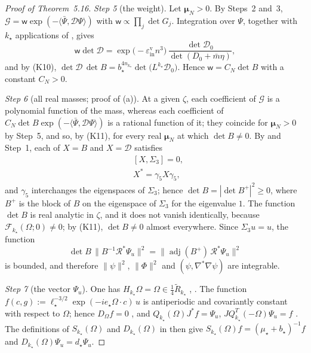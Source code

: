 \documentclass[11pt,letterpaper,reqno]{amsart}
\theoremstyle{definition}
\begin{document}
\begin{proof}[Proof of Theorem~5.16]
\emph{Step 5} (the weight).
Let $\boldsymbol\mu_N>0$.
By Steps~2 and~3, $\mathcal G=\mathsf w\exp(-\langle\bar\Psi,\mathcal D\Psi\rangle)$ with $\mathsf w\propto\prod_j\det G_j$.
Integration over $\Psi$, together with $k_\star$ applications of \cite[Proposition~22.2\,(a)]{QEDIII}, gives
\begin{equation*}
\mathsf w\det\mathcal D=\exp\bigl(-\varepsilon^{\mathrm v}_{\mathrm{in}}n^3\bigr)\,\frac{\det\mathcal D_0}{\det(D_0+\bar m\eta)},
\end{equation*}
and by (K10), $\det\mathcal D\,\allowbreak \det B=\allowbreak b_\star^{4n_{k_\star}}\det\bigl(L^{k_\star}\mathcal D_0\bigr)$.
Hence $\mathsf w=C_N\det B$ with a constant $C_N>0$.

\emph{Step 6} (all real masses; proof of (a)).
At a given $\zeta$, each coefficient of $\mathcal G$ is a polynomial function of the mass, whereas each coefficient of $C_N\det B\exp(-\langle\bar\Psi,\mathcal D\Psi\rangle)$ is a rational function of it;
they coincide for $\boldsymbol\mu_N>0$ by Step~5, and so, by (K11), for every real $\boldsymbol\mu_N$ at which $\det B\ne0$.
By \cite[(I.O2), (I.O3)]{QEDIII} and Step~1, each of $X=B$ and $X=\mathcal D$ satisfies
\begin{align}
&[X,\Sigma_3]=0,\tag{P1}\\
&X^*=\gamma_5X\gamma_5,\tag{P2}
\end{align}
and $\gamma_5$ interchanges the eigenspaces of $\Sigma_3$;
hence $\det B=|\det B^+|^2\ge0$, where $B^+$ is the block of $B$ on the eigenspace of $\Sigma_3$ for the eigenvalue $1$.
The function $\det B$ is real analytic in $\zeta$, and it does not vanish identically, because $\mathscr F_{k_\star}(\Omega;0)\ne0$;
by (K11), $\det B\ne0$ almost everywhere.
Since $\Sigma_3u=u$, the function
\begin{equation*}
\det B\,\|B^{-1}\mathcal R^*\Psi_u\|^2=\|\operatorname{adj}(B^+)\,\mathcal R^*\Psi_u\|^2
\end{equation*}
is bounded, and therefore $\|\psi\|^2$, $\|\Phi\|^2$ and $(\psi,\nabla^*\nabla\psi)$ are integrable.

\emph{Step 7} (the vector $\Psi_u$).
One has $H_{k_\star}\Omega=\Omega\in\frac14\tilde R_{k_\star}$ \cite[Proposition~5.31]{QEDI}, \cite{QEDIII}.
The function $f(c,g):=\ell_\star^{-3/2}\exp(-ie_\star\Omega\cdot c)\,u$ is antiperiodic and covariantly constant with respect to $\Omega$;
hence $D_\Omega f=0$ \cite[(I.O8)]{QEDIII}, and $Q_{k_\star}(\Omega)J^*f=\Psi_u$, $JQ^T_{k_\star}(-\Omega)\Psi_u=f$ \cite{QEDIII}.
The definitions of $S_{k_\star}(\Omega)$ and $D_{k_\star}(\Omega)$ in \cite{QEDIII} then give $S_{k_\star}(\Omega)f=(\mu_\star+b_\star)^{-1}f$ and $D_{k_\star}(\Omega)\Psi_u=d_\star\Psi_u$.


\end{proof}
\end{document}
